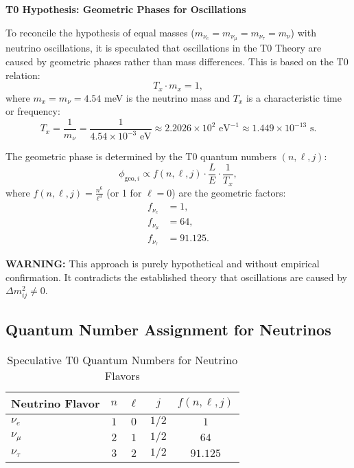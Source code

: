 \documentclass[12pt,a4paper]{article}
\begin{document}
	\begin{speculation}
		\textbf{T0 Hypothesis: Geometric Phases for Oscillations}
		
		To reconcile the hypothesis of equal masses ($m_{\nu_e} = m_{\nu_\mu} = m_{\nu_\tau} = m_\nu$) with neutrino oscillations, it is speculated that oscillations in the T0 Theory are caused by geometric phases rather than mass differences. This is based on the T0 relation:
		\[
		T_x \cdot m_x = 1,
		\]
		where $m_x = m_\nu = 4.54$ meV is the neutrino mass and $T_x$ is a characteristic time or frequency:
		\[
		T_x = \frac{1}{m_\nu} = \frac{1}{4.54 \times 10^{-3} \text{ eV}} \approx 2.2026 \times 10^2 \text{ eV}^{-1} \approx 1.449 \times 10^{-13} \text{ s}.
		\]
		
		The geometric phase is determined by the T0 quantum numbers $(n, \ell, j)$:
		\[
		\phi_{\text{geo}, i} \propto f(n, \ell, j) \cdot \frac{L}{E} \cdot \frac{1}{T_x},
		\]
		where $f(n, \ell, j) = \frac{n^6}{\ell^3}$ (or 1 for $\ell = 0$) are the geometric factors:
		\begin{align}
			f_{\nu_e} &= 1, \\
			f_{\nu_\mu} &= 64, \\
			f_{\nu_\tau} &= 91.125.
		\end{align}
		
		\textbf{WARNING:} This approach is purely hypothetical and without empirical confirmation. It contradicts the established theory that oscillations are caused by $\Delta m^2_{ij} \neq 0$.
	\end{speculation}
	
	\subsection{Quantum Number Assignment for Neutrinos}
	
	\begin{table}[h]
		\centering
		\begin{tabular}{lcccc}
			\toprule
			\textbf{Neutrino Flavor} & \textbf{$n$} & \textbf{$\ell$} & \textbf{$j$} & \textbf{$f(n,\ell,j)$} \\
			\midrule
			$\nu_e$ & $1$ & $0$ & $1/2$ & $1$ \\
			$\nu_\mu$ & $2$ & $1$ & $1/2$ & $64$ \\
			$\nu_\tau$ & $3$ & $2$ & $1/2$ & $91.125$ \\
			\bottomrule
		\end{tabular}
		\caption{Speculative T0 Quantum Numbers for Neutrino Flavors}
	\end{table}
	
\end{document}
